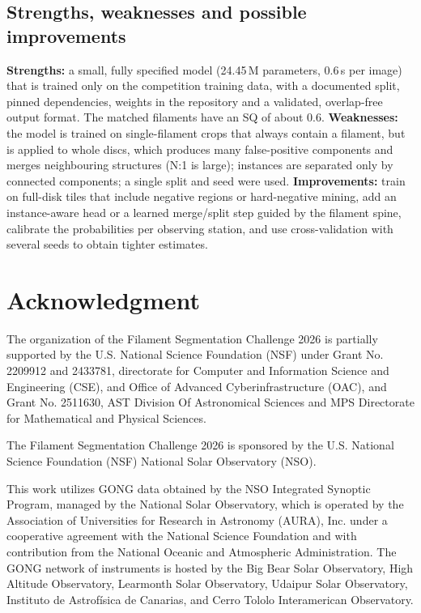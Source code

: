 \documentclass[sigconf]{acmart}
\begin{document}
\subsection{Strengths, weaknesses and possible improvements}
\textbf{Strengths:} a small, fully specified model (24.45\,M parameters, 0.6\,s per image) that is trained only on the competition training data, with a documented split, pinned dependencies, weights in the repository and a validated, overlap-free output format. The matched filaments have an SQ of about 0.6. \textbf{Weaknesses:} the model is trained on single-filament crops that always contain a filament, but is applied to whole discs, which produces many false-positive components and merges neighbouring structures (N:1 is large); instances are separated only by connected components; a single split and seed were used. \textbf{Improvements:} train on full-disk tiles that include negative regions or hard-negative mining, add an instance-aware head or a learned merge/split step guided by the filament spine, calibrate the probabilities per observing station, and use cross-validation with several seeds to obtain tighter estimates.


\section{Acknowledgment}\label{sec:acknowledgment}
    The organization of the Filament Segmentation Challenge 2026 is partially supported by the U.S. National Science Foundation (NSF) under Grant No. 2209912 and 2433781, directorate for Computer and Information Science and Engineering (CSE), and Office of Advanced Cyberinfrastructure (OAC), and Grant No. 2511630, AST Division Of Astronomical Sciences and MPS Directorate for Mathematical and Physical Sciences.

    The Filament Segmentation Challenge 2026 is sponsored by the U.S. National Science Foundation (NSF) National Solar Observatory (NSO).

    This work utilizes GONG data obtained by the NSO Integrated Synoptic Program, managed by the National Solar Observatory, which is operated by the Association of Universities for Research in Astronomy (AURA), Inc. under a cooperative agreement with the National Science Foundation and with contribution from the National Oceanic and Atmospheric Administration. The GONG network of instruments is hosted by the Big Bear Solar Observatory, High Altitude Observatory, Learmonth Solar Observatory, Udaipur Solar Observatory, Instituto de Astrofísica de Canarias, and Cerro Tololo Interamerican Observatory.



\end{document}
